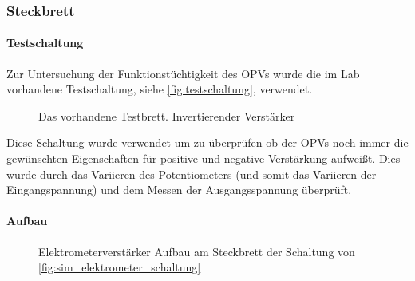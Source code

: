 \documentclass[12pt,english,ngerman]{scrartcl}
\begin{document}
\subsubsection{Steckbrett} \label{sec:elektrometer_steckbrett}

\paragraph{Testschaltung}
Zur Untersuchung der Funktionstüchtigkeit des OPVs wurde die im Lab vorhandene
Testschaltung, siehe \autoref{fig:testschaltung}, verwendet. 

\begin{figure}[H]
  \centering
  \caption{Das vorhandene Testbrett. Invertierender Verstärker}
  \label{fig:testschaltung}
\end{figure}

Diese Schaltung wurde verwendet um zu überprüfen ob der OPVs noch immer die
gewünschten Eigenschaften für positive und negative Verstärkung aufweißt. Dies
wurde durch das Variieren des Potentiometers (und somit das Variieren der
Eingangspannung) und dem Messen der Ausgangsspannung überprüft.

\paragraph{Aufbau}

\begin{figure}[H]
  \centering
  \caption{Elektrometerverstärker Aufbau am Steckbrett der Schaltung von
  \autoref{fig:sim_elektrometer_schaltung}}
  \label{fig:ver_elektromete_aufbau}
\end{figure}
\end{document}
